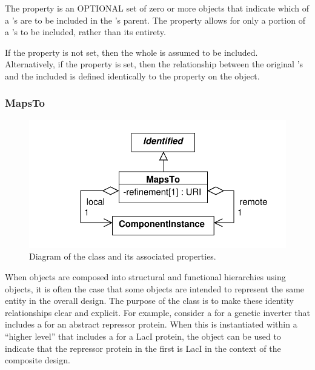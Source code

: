 The  property is an OPTIONAL set of zero or more  objects that indicate which  of a 's  are to be included in the 's parent. The  property
allows for only a portion of a 's  to be included, rather than its entirety.

If the  property is not set, then the whole  is assumed to be included. Alternatively,
if the  property is set, then the relationship between the original 's
 and the included  is defined identically to the 
property on the  object.


\subsubsection{MapsTo}
\label{sec:MapsTo}

\begin{figure}[ht]
\begin{center}
\includegraphics[scale=0.6]{uml/maps_to}
\caption[]{Diagram of the  class and its associated properties.}
\label{uml:maps_to}
\end{center}
\end{figure}

When  objects are composed into structural and functional hierarchies using  objects, it is often the case that some  objects are intended to represent the same entity in the overall design. The purpose of the  class is to make these identity relationships clear and explicit.  For example, consider a  for a genetic inverter that includes a  for an abstract repressor protein.  When this  is instantiated within a ``higher level''  that includes a  for a LacI protein, the  object can be used to indicate that the repressor protein in the first  is LacI in the context of the composite design.

